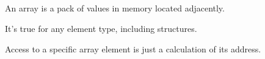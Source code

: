 ﻿\subsection{\Conclusion{}}

An array is a pack of values in memory located adjacently.

It's true for any element type, including structures.

Access to a specific array element is just a calculation of its address.
